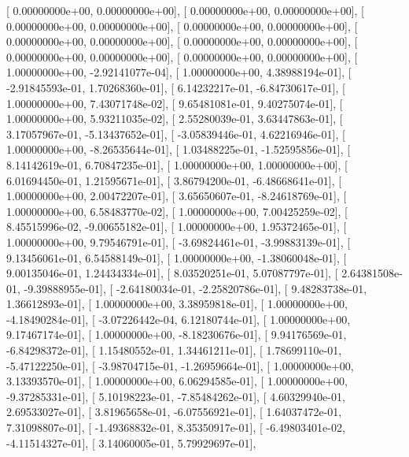 \documentclass{article}
\begin{document}
       [  0.00000000e+00,   0.00000000e+00],
       [  0.00000000e+00,   0.00000000e+00],
       [  0.00000000e+00,   0.00000000e+00],
       [  0.00000000e+00,   0.00000000e+00],
       [  0.00000000e+00,   0.00000000e+00],
       [  0.00000000e+00,   0.00000000e+00],
       [  0.00000000e+00,   0.00000000e+00],
       [  0.00000000e+00,   0.00000000e+00],
       [  1.00000000e+00,  -2.92141077e-04],
       [  1.00000000e+00,   4.38988194e-01],
       [ -2.91845593e-01,   1.70268360e-01],
       [  6.14232217e-01,  -6.84730617e-01],
       [  1.00000000e+00,   7.43071748e-02],
       [  9.65481081e-01,   9.40275074e-01],
       [  1.00000000e+00,   5.93211035e-02],
       [  2.55280039e-01,   3.63447863e-01],
       [  3.17057967e-01,  -5.13437652e-01],
       [ -3.05839446e-01,   4.62216946e-01],
       [  1.00000000e+00,  -8.26535644e-01],
       [  1.03488225e-01,  -1.52595856e-01],
       [  8.14142619e-01,   6.70847235e-01],
       [  1.00000000e+00,   1.00000000e+00],
       [  6.01694450e-01,   1.21595671e-01],
       [  3.86794200e-01,  -6.48668641e-01],
       [  1.00000000e+00,   2.00472207e-01],
       [  3.65650607e-01,  -8.24618769e-01],
       [  1.00000000e+00,   6.58483770e-02],
       [  1.00000000e+00,   7.00425259e-02],
       [  8.45515996e-02,  -9.00655182e-01],
       [  1.00000000e+00,   1.95372465e-01],
       [  1.00000000e+00,   9.79546791e-01],
       [ -3.69824461e-01,  -3.99883139e-01],
       [  9.13456061e-01,   6.54588149e-01],
       [  1.00000000e+00,  -1.38060048e-01],
       [  9.00135046e-01,   1.24434334e-01],
       [  8.03520251e-01,   5.07087797e-01],
       [  2.64381508e-01,  -9.39888955e-01],
       [ -2.64180034e-01,  -2.25820786e-01],
       [  9.48283738e-01,   1.36612893e-01],
       [  1.00000000e+00,   3.38959818e-01],
       [  1.00000000e+00,  -4.18490284e-01],
       [ -3.07226442e-04,   6.12180744e-01],
       [  1.00000000e+00,   9.17467174e-01],
       [  1.00000000e+00,  -8.18230676e-01],
       [  9.94176569e-01,  -6.84298372e-01],
       [  1.15480552e-01,   1.34461211e-01],
       [  1.78699110e-01,  -5.47122250e-01],
       [ -3.98704715e-01,  -1.26959664e-01],
       [  1.00000000e+00,   3.13393570e-01],
       [  1.00000000e+00,   6.06294585e-01],
       [  1.00000000e+00,  -9.37285331e-01],
       [  5.10198223e-01,  -7.85484262e-01],
       [  4.60329940e-01,   2.69533027e-01],
       [  3.81965658e-01,  -6.07556921e-01],
       [  1.64037472e-01,   7.31098807e-01],
       [ -1.49368832e-01,   8.35350917e-01],
       [ -6.49803401e-02,  -4.11514327e-01],
       [  3.14060005e-01,   5.79929697e-01],
\end{document}

